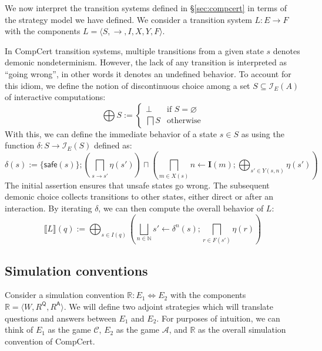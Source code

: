 \documentclass[format=sigplan,authordraft]{acmart}
\newcommand{\kw}[1]{\ensuremath{\mathsf{#1}}}
\begin{document}
We now interpret the transition systems defined in \S\ref{sec:compcert}
in terms of the strategy model we have defined.
We consider a transition system $L : E \rightarrow F$
with the components $L = \langle S, {\rightarrow}, I, X, Y, F \rangle$.

In CompCert transition systems,
multiple transitions from a given state $s$
denotes demonic nondeterminism.
However,
the lack of any transition is interpreted as ``going wrong'',
in other words it denotes an undefined behavior.
To account for this idiom,
we define the notion of discontinuous choice among
a set $S \subseteq \mathcal{I}_E(A)$ of interactive computations:
\[
    \bigoplus S :=
    \begin{cases}
      \bot & \mbox{if } S = \varnothing \\
      \bigsqcap S & \mbox{otherwise}
    \end{cases}
\]
With this,
we can define the immediate behavior of a state $s \in S$ as
using the function $\delta : S \rightarrow \mathcal{I}_E(S)$
defined as:
\[
  \delta(s) :=
    \{ \kw{safe}(s) \} ;
    \left( \bigsqcap_{s \rightarrow s'} \eta(s') \right)
    \sqcap
    \left( \bigsqcap_{m \in X(s)} n \leftarrow \mathbf{I}(m) ;
            \bigoplus_{s' \in Y(s, n)} \eta(s') \right)
\]
The initial assertion ensures that unsafe states go wrong.
The subsequent demonic choice
collects transitions to other states,
either direct or after an interaction.
By iterating $\delta$, we can then compute the overall behavior of $L$:
\[
   \llbracket L \rrbracket (q) :=
     \bigoplus_{s \in I(q)}
     \left(
     \bigsqcup_{n \in \mathbb{N}}
     s' \leftarrow \delta^n(s) ; \bigsqcap_{r \in F(s')} \eta(r)
     \right)
\]


\subsection{Simulation conventions} %

Consider a simulation convention $\mathbb{R} : E_1 \Leftrightarrow E_2$
with the components $\mathbb{R} = \langle W, R^\kw{Q}, R^\kw{A} \rangle$.
We will define two adjoint strategies
which will translate questions and answers between
$E_1$ and $E_2$.
For purposes of intuition,
we can think of $E_1$ as the game $\mathcal{C}$,
$E_2$ as the game $\mathcal{A}$,
and $\mathbb{R}$ as the overall simulation convention of CompCert.
\end{document}

